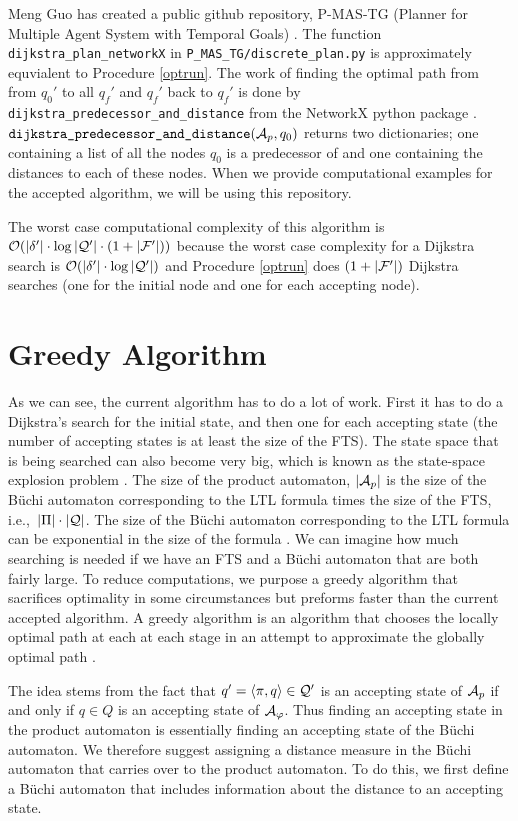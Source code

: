 Meng Guo has created a public github repository, P-MAS-TG (Planner for Multiple Agent System with Temporal Goals) \cite{pMasGit}. The function \texttt{dijkstra\_plan\_networkX} in \texttt{P\_MAS\_TG/discrete\_plan.py} is approximately equvialent to Procedure \ref{optrun}. The work of finding the optimal path from from $q_0'$ to all $q_f'$ and $q_f'$ back to $q_f'$ is done by \texttt{dijkstra\_predecessor\_and\_distance} from the NetworkX python package \cite{schult08}. $\texttt{dijkstra\_predecessor\_and\_distance}(\mathcal{A}_p,q_0)$ returns two dictionaries; one containing a list of all the nodes $q_0$ is a predecessor of and one containing the distances to each of these nodes. When we provide computational examples for the accepted algorithm, we will be using this repository. 


The worst case computational complexity of this algorithm is $\mathcal{O}(|\delta'| \cdot \log|\mathcal{Q}'| \cdot (1 + |\mathcal{F}'|))$ because the worst case complexity for a Dijkstra search is $\mathcal{O}(|\delta'| \cdot \log|\mathcal{Q}'| )$ and Procedure \ref{optrun} does $(1+ |\mathcal{F}'|)$ Dijkstra searches (one for the initial node and one for each accepting node).

\section{Greedy Algorithm}

As we can see, the current algorithm has to do a lot of work. First it has to do a Dijkstra's search for the initial state, and then one for each accepting state (the number of accepting states is at least the size of the FTS). The state space that is being searched can also become very big, which is known as the state-space explosion problem \cite{clarke99}. The size of the product automaton, $|\mathcal{A}_p|$ is the size of the B\"{u}chi automaton corresponding to the LTL formula times the size of the FTS, i.e.,\ $|\Pi| \cdot |\mathcal{Q}|$. The size of the B\"{u}chi automaton corresponding to the LTL formula can be exponential in the size of the formula \cite{giannakopoulou02}. We can imagine how much searching is needed if we have an FTS and a B\"{u}chi automaton that are both fairly large. To reduce computations, we purpose a greedy algorithm that sacrifices optimality in some circumstances but preforms faster than the current accepted algorithm. A greedy algorithm is an algorithm that chooses the locally optimal path at each at each stage in an attempt to approximate the globally optimal path \cite{cormen01}.

The idea stems from the fact that $q' = \langle \pi, q \rangle \in \mathcal{Q}'$ is an accepting state of $\mathcal{A}_p$ if and only if $q \in Q$ is an accepting state of $\mathcal{A}_\varphi$. Thus finding an accepting state in the product automaton is essentially finding an accepting state of the B\"{u}chi automaton. We therefore suggest assigning a distance measure in the B\"{u}chi automaton that carries over to the product automaton. To do this, we first define a B\"{u}chi automaton that includes information about the distance to an accepting state.

